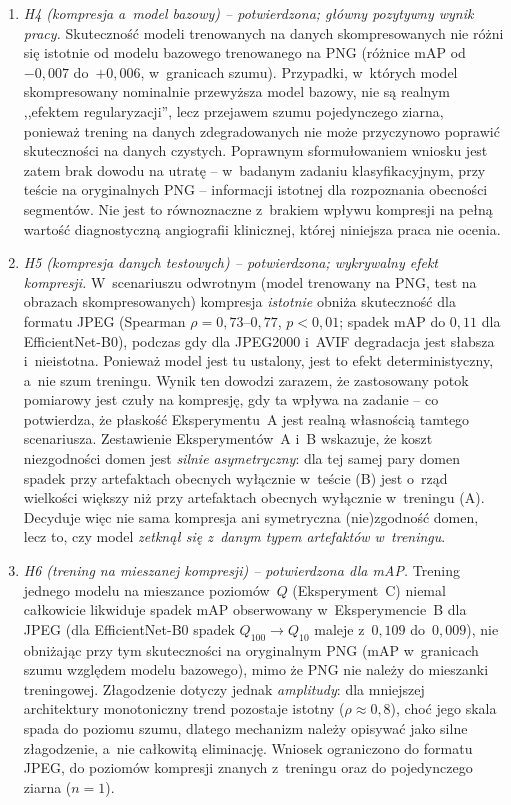 \documentclass[12pt,a4paper]{article}
\begin{document}
\begin{enumerate}
    \item \emph{H4 (kompresja a~model bazowy) -- potwierdzona; główny pozytywny wynik pracy.} Skuteczność modeli trenowanych na danych skompresowanych nie różni się istotnie od modelu bazowego trenowanego na PNG (różnice mAP od~$-0{,}007$ do~$+0{,}006$, w~granicach szumu). Przypadki, w~których model skompresowany nominalnie przewyższa model bazowy, nie są realnym ,,efektem regularyzacji'', lecz przejawem szumu pojedynczego ziarna, ponieważ trening na danych zdegradowanych nie może przyczynowo poprawić skuteczności na danych czystych. Poprawnym sformułowaniem wniosku jest zatem brak dowodu na utratę -- w~badanym zadaniu klasyfikacyjnym, przy teście na oryginalnych PNG -- informacji istotnej dla rozpoznania obecności segmentów. Nie jest to równoznaczne z~brakiem wpływu kompresji na pełną wartość diagnostyczną angiografii klinicznej, której niniejsza praca nie ocenia.

    \item \emph{H5 (kompresja danych testowych) -- potwierdzona; wykrywalny efekt kompresji.} W~scenariuszu odwrotnym (model trenowany na PNG, test na obrazach skompresowanych) kompresja \emph{istotnie} obniża skuteczność dla formatu JPEG (Spearman $\rho=0{,}73$--$0{,}77$, $p<0{,}01$; spadek mAP do $0{,}11$ dla EfficientNet-B0), podczas gdy dla JPEG2000 i~AVIF degradacja jest słabsza i~nieistotna. Ponieważ model jest tu ustalony, jest to efekt deterministyczny, a~nie szum treningu. Wynik ten dowodzi zarazem, że zastosowany potok pomiarowy jest czuły na kompresję, gdy ta wpływa na zadanie -- co potwierdza, że płaskość Eksperymentu~A jest realną własnością tamtego scenariusza. Zestawienie Eksperymentów~A i~B wskazuje, że koszt niezgodności domen jest \emph{silnie asymetryczny}: dla tej samej pary domen spadek przy artefaktach obecnych wyłącznie w~teście (B) jest o~rząd wielkości większy niż przy artefaktach obecnych wyłącznie w~treningu (A). Decyduje więc nie sama kompresja ani symetryczna (nie)zgodność domen, lecz to, czy model \emph{zetknął się z~danym typem artefaktów w~treningu}.

    \item \emph{H6 (trening na mieszanej kompresji) -- potwierdzona dla mAP.} Trening jednego modelu na mieszance poziomów~$Q$ (Eksperyment~C) niemal całkowicie likwiduje spadek mAP obserwowany w~Eksperymencie~B dla JPEG (dla EfficientNet-B0 spadek $Q_{100}\!\to\!Q_{10}$ maleje z~$0{,}109$ do~$0{,}009$), nie obniżając przy tym skuteczności na oryginalnym PNG (mAP w~granicach szumu względem modelu bazowego), mimo że PNG nie należy do mieszanki treningowej. Złagodzenie dotyczy jednak \emph{amplitudy}: dla mniejszej architektury monotoniczny trend pozostaje istotny ($\rho\approx0{,}8$), choć jego skala spada do poziomu szumu, dlatego mechanizm należy opisywać jako silne złagodzenie, a~nie całkowitą eliminację. Wniosek ograniczono do formatu JPEG, do poziomów kompresji znanych z~treningu oraz do pojedynczego ziarna ($n=1$).


\end{enumerate}
\end{document}
